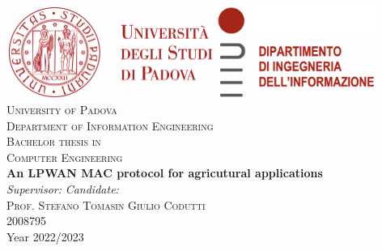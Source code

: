 








\begin{titlepage}
    \begin{center}
        \includegraphics[height=3cm]{images/logo_unipd.png} \hfill
        \includegraphics[height=3cm]{images/logo_dei.png}\\
        \vspace{1.7cm}
        \textsc{\LARGE University of Padova}\\
        \vspace{0.45cm}
        \textsc{\large Department of Information Engineering}\\
        \vspace{0.4cm}
        \textsc{\large Bachelor thesis in }\\
        \textsc{\large Computer Engineering}\\
        \vfill
        { \LARGE \bfseries An LPWAN MAC protocol for agricutural applications
        }\\
        \vfill
        \textit{\large Supervisor:} \hfill \textit{\large Candidate:}\\
        \textsc{\large Prof. Stefano Tomasin} \hfill \textsc{Giulio Codutti}\\
        \hfill \textsc{2008795}\\

        \vspace{2.5cm}
        {\large Year 2022/2023}
    \end{center}
\end{titlepage}



